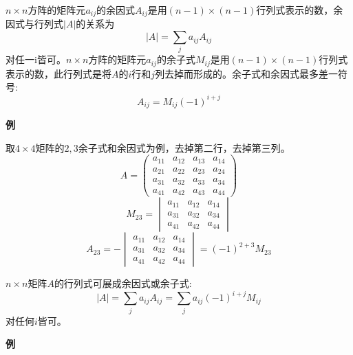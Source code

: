 \begin{definition}
    $n \times n$方阵的矩阵元$a_{ij}$的余因式$A_{ij}$是用$(n-1) \times (n-1)$行列式表示的数，余因式与行列式$|A|$的关系为
    \[|A|=\sum_ja_{ij}A_{ij} \tag{3-30}\]
    对任一i皆可。$n \times n$方阵的矩阵元$a_{ij}$的余子式$M_{ij}$是用$(n-1) \times (n-1)$行列式表示的数，此行列式是将$A$的$i$行和$j$列去掉而形成的。余子式和余因式最多差一符号:
    \[A_{ij}=M_{ij}(-1)^{i+j}\]
\end{definition}

\textbf{例}

取$4 \times 4$矩阵的$2,3$余子式和余因式为例，去掉第二行，去掉第三列。
\[
A=
\begin{pmatrix}
    a_{11} & a_{12} & a_{13} & a_{14} \\
    a_{21} & a_{22} & a_{23} & a_{24} \\
    a_{31} & a_{32} & a_{33} & a_{34} \\
    a_{41} & a_{42} & a_{43} & a_{44} 
\end{pmatrix}    
\]
\[
M_{23}=
\begin{vmatrix}
    a_{11} & a_{12} & a_{14} \\
    a_{31} & a_{32} & a_{34} \\
    a_{41} & a_{42} & a_{44} 
\end{vmatrix}    
\]
\[
A_{23}=-
\begin{vmatrix}
    a_{11} & a_{12} & a_{14} \\
    a_{31} & a_{32} & a_{34} \\
    a_{41} & a_{42} & a_{44} 
\end{vmatrix}    
=(-1)^{2+3}M_{23}
\]

\begin{theorem}
    $n \times n$矩阵$A$的行列式可展成余因式或余子式:
    \[|A|=\sum_ja_{ij}A_{ij}=\sum_ja_{ij}(-1)^{i+j}M_{ij}\]
    对任何$i$皆可。
\end{theorem}

\textbf{例}


